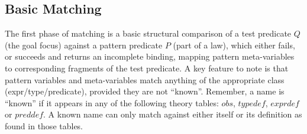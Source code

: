 \subsection{Basic Matching}

The first phase of matching is a basic structural comparison
of a test predicate $Q$ (the goal focus) against a pattern predicate $P$ (part of a law),
which either fails,
or succeeds and returns an incomplete binding,
mapping pattern meta-variables to corresponding fragments of the test predicate.
A key feature to note is that pattern variables and meta-variables
match anything of the appropriate class (expr/type/predicate),
provided they are not ``known''.
Remember, a name is ``known'' if it appears in any of the following theory
tables: $obs$, $typedef$, $exprdef$ or $preddef$.
A known name can only match against either itself
or its definition as found in those tables.

